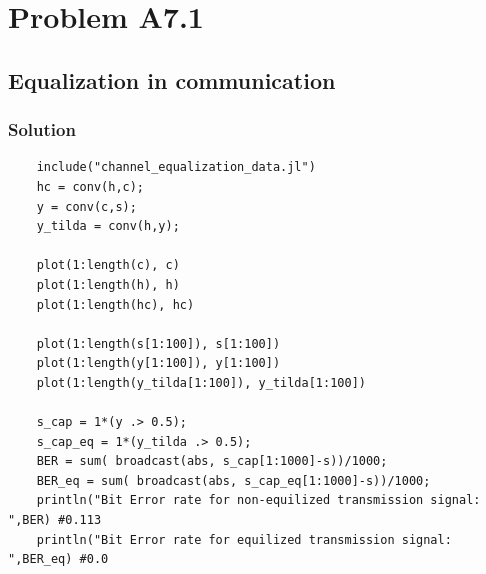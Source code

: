 \documentclass{article}
\begin{document}
\section*{Problem A7.1}
\subsection*{Equalization in communication}
\subsubsection*{Solution}
\begin{verbatim}
    include("channel_equalization_data.jl")    
    hc = conv(h,c);
    y = conv(c,s);
    y_tilda = conv(h,y);
    
    plot(1:length(c), c)
    plot(1:length(h), h)
    plot(1:length(hc), hc)
    
    plot(1:length(s[1:100]), s[1:100])
    plot(1:length(y[1:100]), y[1:100])
    plot(1:length(y_tilda[1:100]), y_tilda[1:100])
    
    s_cap = 1*(y .> 0.5);
    s_cap_eq = 1*(y_tilda .> 0.5);
    BER = sum( broadcast(abs, s_cap[1:1000]-s))/1000;
    BER_eq = sum( broadcast(abs, s_cap_eq[1:1000]-s))/1000;
    println("Bit Error rate for non-equilized transmission signal: ",BER) #0.113
    println("Bit Error rate for equilized transmission signal: ",BER_eq) #0.0
    \end{verbatim}
\end{document}
